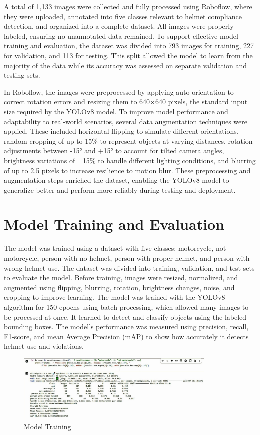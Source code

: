 \begin{refsection}
A total of 1,133 images were collected and fully processed using Roboflow, where they were uploaded, annotated into five classes relevant to helmet compliance detection, and organized into a complete dataset. All images were properly labeled, ensuring no unannotated data remained. To support effective model training and evaluation, the dataset was divided into 793 images for training, 227 for validation, and 113 for testing. This split allowed the model to learn from the majority of the data while its accuracy was assessed on separate validation and testing sets.

In Roboflow, the images were preprocessed by applying auto-orientation to correct rotation errors and resizing them to 640×640 pixels, the standard input size required by the YOLOv8 model. To improve model performance and adaptability to real-world scenarios, several data augmentation techniques were applied. These included horizontal flipping to simulate different orientations, random cropping of up to 15\% to represent objects at varying distances, rotation adjustments between -15° and +15° to account for tilted camera angles, brightness variations of ±15\% to handle different lighting conditions, and blurring of up to 2.5 pixels to increase resilience to motion blur. These preprocessing and augmentation steps enriched the dataset, enabling the YOLOv8 model to generalize better and perform more reliably during testing and deployment.

\section{Model Training and Evaluation}
\noindent
The model was trained using a dataset with five classes: motorcycle, not motorcycle, person with no helmet, person with proper helmet, and person with wrong helmet use. The dataset was divided into training, validation, and test sets to evaluate the model. Before training, images were resized, normalized, and augmented using flipping, blurring, rotation, brightness changes, noise, and cropping to improve learning. The model was trained with the YOLOv8 algorithm for 150 epochs using batch processing, which allowed many images to be processed at once. It learned to detect and classify objects using the labeled bounding boxes. The model’s performance was measured using precision, recall, F1-score, and mean Average Precision (mAP) to show how accurately it detects helmet use and violations.

\begin{figure}[ht]
    \centering
	\includegraphics[width=0.85\textwidth]{figures/Fig 13.jpg}
	\caption[Model Training]{Model Training}
	\label{fig:model_training}
\end{figure}


\end{refsection}
